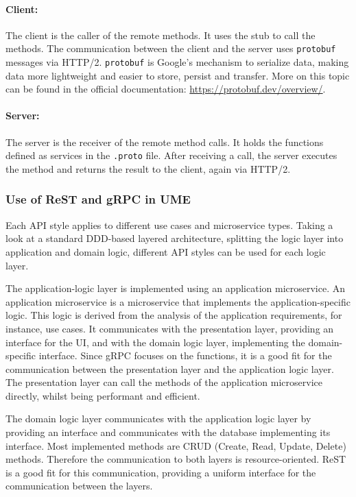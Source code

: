 \paragraph*{Client:}
The client is the caller of the remote methods.
It uses the stub to call the methods.
The communication between the client and the server uses \texttt{protobuf} messages via HTTP/2.
\texttt{protobuf} is Google's mechanism to serialize data, making data more lightweight and easier to store, persist and transfer.
More on this topic can be found in the official documentation: \url{https://protobuf.dev/overview/}.

\paragraph*{Server:}
The server is the receiver of the remote method calls.
It holds the functions defined as services in the \texttt{.proto} file.
After receiving a call, the server executes the method and returns the result to the client, again via HTTP/2.

\subsubsection*{Use of ReST and gRPC in UME}
Each API style applies to different use cases and microservice types.
Taking a look at a standard DDD-based layered architecture, splitting the logic layer into application and domain logic, different API styles can be used for each logic layer.

The application-logic layer is implemented using an application microservice.
An application microservice is a microservice that implements the application-specific logic.
This logic is derived from the analysis of the application requirements, for instance, use cases.
It communicates with the presentation layer, providing an interface for the UI, and with the domain logic layer, implementing the domain-specific interface.
Since gRPC focuses on the functions, it is a good fit for the communication between the presentation layer and the application logic layer.
The presentation layer can call the methods of the application microservice directly, whilst being performant and efficient.

The domain logic layer communicates with the application logic layer by providing an interface and communicates with the database implementing its interface.
Most implemented methods are CRUD (Create, Read, Update, Delete) methods.
Therefore the communication to both layers is resource-oriented.
ReST is a good fit for this communication, providing a uniform interface for the communication between the layers.

